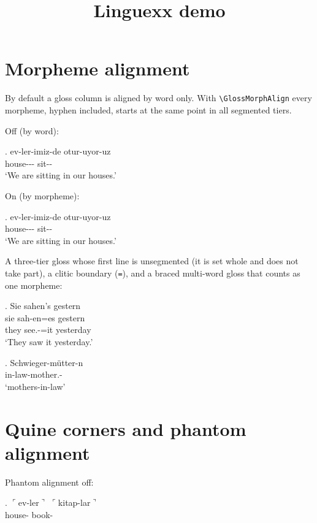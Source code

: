 \documentclass[11pt]{article}
\title{Linguexx demo}
\date{}
\newcommand{\qq}{\ensuremath{\ulcorner}}
\newcommand{\qqr}{\ensuremath{\urcorner}}
\begin{document}
\maketitle

\section{Morpheme alignment}

By default a gloss column is aligned by word only. With
\verb|\GlossMorphAlign| every morpheme, hyphen included, starts at the same
point in all segmented tiers.

\noindent Off (by word):

\ex. \gll ev-ler-imiz-de otur-uyor-uz \\
          house--- sit-- \\
\glt `We are sitting in our houses.'

\noindent On (by morpheme):

{\GlossMorphAlign
\ex. \gll ev-ler-imiz-de otur-uyor-uz \\
          house--- sit-- \\
\glt `We are sitting in our houses.'

}

\noindent A three-tier gloss whose first line is unsegmented (it is set
whole and does not take part), a clitic boundary (\texttt{=}), and a braced
multi-word gloss that counts as one morpheme:

{\GlossMorphAlign
\ex. \glll Sie sahen's gestern \\
           sie sah-en=es gestern \\
           they see.-={it} yesterday \\
\glt `They saw it yesterday.'

\ex. \gll Schwieger-mütter-n \\
          {in-law}-mother.- \\
\glt `mothers-in-law'

}

\section{Quine corners and phantom alignment}


\noindent Phantom alignment off:

\ex. \gll \qq{}ev-ler\qqr{} \qq{}kitap-lar\qqr{} \\
          house- book- \\
\end{document}
